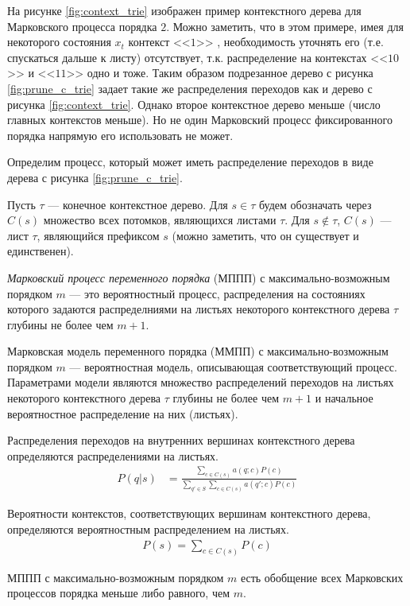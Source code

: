 \documentclass{matmex-diploma-custom}
\begin{document}
На рисунке \ref{fig:context_trie} изображен пример контекстного дерева для Марковского процесса порядка $ 2 $.
Можно заметить, что в этом примере, имея для некоторого состояния $x_{t}$ контекст  <<$1$>> , необходимость уточнять его (т.е. спускаться дальше к листу) отсутствует, т.к. распределение на контекстах  <<$10$>>  и  <<$11$>>  одно и тоже. 
Таким образом подрезанное дерево с рисунка \ref{fig:prune_c_trie} задает такие же распределения переходов как и дерево с рисунка \ref{fig:context_trie}. 
Однако второе контекстное дерево меньше (число главных контекстов меньше).
Но не один Марковский процесс фиксированного порядка напрямую его использовать не может.

Определим процесс, который может иметь распределение переходов в виде дерева с рисунка \ref{fig:prune_c_trie}.

Пусть $\tau$ --- конечное контекстное дерево.
Для $s \in \tau$ будем обозначать через $ C(s) $ множество всех потомков, являющихся листами $\tau$. 
Для $s \notin \tau$, $C(s)$ --- лист $\tau$, являющийся префиксом  $s$ (можно заметить, что он существует и единственен).
\begin{definition}
\textit{Марковский процесс переменного порядка} (МППП) с максимально-возможным порядком $m$ --- это вероятностный процесс, распределения на состояниях которого задаются распределниями на листьях некоторого контекстного дерева $\tau$ глубины не более чем $m+1$.
\label{def:c_trie}
\end{definition}

\begin{definition}
Марковская модель переменного порядка (ММПП) с максимально-возможным порядком $m$ --- вероятностная модель, описывающая соответствующий процесс.
Параметрами модели являются множество распределений переходов на листьях некоторого контекстного дерева $\tau$ глубины не более чем $m+1$ и начальное вероятностное распределение на них (листьях).
\end{definition}

\begin{remark}
Распределения переходов на внутренних вершинах контекстного дерева определяются распределениями на листьях.
\begin{align}
P(q| s) &= \frac{\sum_{c \in C(s)} {a(q; c)P(c)}}{\sum_{q' \in S}\sum_{c \in C(s)} {a(q';c)P(c)}}
\label{formula:ap_p}
\end{align}
\end{remark}
\begin{remark}
Вероятности контекстов, соответствующих вершинам контекстного дерева, определяются вероятностным распределением на листьях.
\begin{align}
P(s) = \sum_{c \in C(s)}{P(c)}
\label{formula:p}
\end{align}
\end{remark}
\begin{remark}
МППП с максимально-возможным порядком $m$ есть обобщение всех Марковских процессов порядка меньше либо равного, чем $ m $.
\end{remark}
\end{document}
